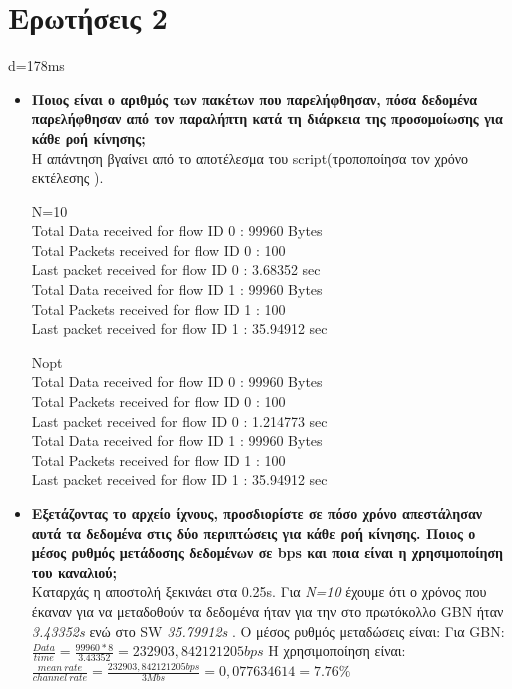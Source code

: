 \documentclass{article}
\begin{document}
\section*{Ερωτήσεις 2}
d=178ms
\begin{itemize}
	\item \textbf{Ποιος είναι ο αριθμός των πακέτων που παρελήφθησαν, πόσα δεδομένα παρελήφθησαν από τον
		παραλήπτη κατά τη διάρκεια της προσομοίωσης για κάθε ροή κίνησης;}
	\\Η απάντηση βγαίνει από το αποτέλεσμα του script(τροποποίησα τον χρόνο εκτέλεσης ).
		\begin{framed}
			N=10
			\\Total Data received for flow ID 0	: 99960 Bytes\\
			Total Packets received for flow ID 0	: 100\\
			Last packet received for flow ID 0	: 3.68352 sec\\
			Total Data received for flow ID 1	: 99960 Bytes\\
			Total Packets received for flow ID 1	: 100\\
			Last packet received for flow ID 1	: 35.94912 sec
			 \end{framed}
	\begin{framed}
		Nopt
		\\Total Data received for flow ID 0	: 99960 Bytes\\
		Total Packets received for flow ID 0	: 100\\
		Last packet received for flow ID 0	: 1.214773 sec\\
		Total Data received for flow ID 1	: 99960 Bytes\\
		Total Packets received for flow ID 1	: 100\\
		Last packet received for flow ID 1	: 35.94912 sec\end{framed}
	\item \textbf{Εξετάζοντας το αρχείο ίχνους, προσδιορίστε σε πόσο χρόνο απεστάλησαν αυτά τα δεδομένα στις
		δύο περιπτώσεις για κάθε ροή κίνησης. Ποιος ο μέσος ρυθμός μετάδοσης δεδομένων σε bps και
		ποια είναι η χρησιμοποίηση του καναλιού;}
	\\ Καταρχάς η αποστολή ξεκινάει στα 0.25s. Για \textit{N=10} έχουμε ότι ο χρόνος που έκαναν για να μεταδοθούν τα δεδομένα ήταν για την στο πρωτόκολλο GBN ήταν \textit{3.43352s} ενώ στο SW \textit{35.79912s }.
	Ο μέσος ρυθμός μεταδώσεις είναι:
	Για GBN: $\frac{Data}{time}=\frac{99960*8}{3.43352}=232903,842121205bps$
	Η χρησιμοποίηση είναι:
	$\frac{mean\ rate}{channel\ rate}=\frac{232903,842121205bps}{3Mbs}=0,077634614=7.76 \%$

\end{itemize}
\end{document}
